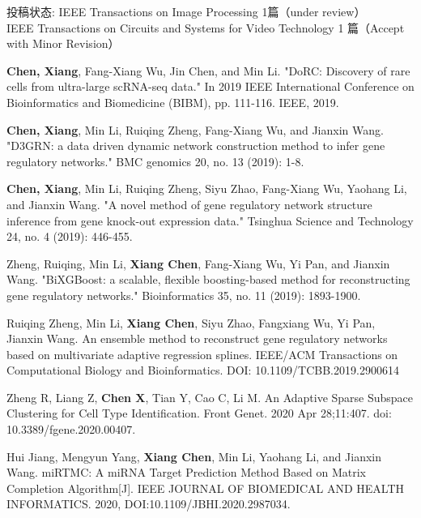 \noindent
投稿状态: 
IEEE Transactions on Image Processing 1篇（under review）\\{}
IEEE Transactions on Circuits and Systems for Video Technology 1 篇（Accept with Minor Revision）
\else
\begin{enumerate}[label={[\arabic*]},itemindent=2em,wide]


\item \textbf{Chen, Xiang}, Fang-Xiang Wu, Jin Chen, and Min Li. "DoRC: Discovery of rare cells from ultra-large scRNA-seq data." In 2019 IEEE International Conference on Bioinformatics and Biomedicine (BIBM), pp. 111-116. IEEE, 2019.
\item \textbf{Chen, Xiang}, Min Li, Ruiqing Zheng, Fang-Xiang Wu, and Jianxin Wang. "D3GRN: a data driven dynamic network construction method to infer gene regulatory networks." BMC genomics 20, no. 13 (2019): 1-8.
\item \textbf{Chen, Xiang}, Min Li, Ruiqing Zheng, Siyu Zhao, Fang-Xiang Wu, Yaohang Li, and Jianxin Wang. "A novel method of gene regulatory network structure inference from gene knock-out expression data." Tsinghua Science and Technology 24, no. 4 (2019): 446-455.
\item Zheng, Ruiqing, Min Li, \textbf{Xiang Chen}, Fang-Xiang Wu, Yi Pan, and Jianxin Wang. "BiXGBoost: a scalable, flexible boosting-based method for reconstructing gene regulatory networks." Bioinformatics 35, no. 11 (2019): 1893-1900.
\item Ruiqing Zheng, Min Li, \textbf{Xiang Chen}, Siyu Zhao, Fangxiang Wu, Yi Pan, Jianxin Wang. An ensemble method to reconstruct gene regulatory networks based on multivariate adaptive regression splines. IEEE/ACM Transactions on Computational Biology and Bioinformatics. DOI: 10.1109/TCBB.2019.2900614
\item Zheng R, Liang Z, \textbf{Chen X}, Tian Y, Cao C, Li M. An Adaptive Sparse Subspace Clustering for Cell Type Identification. Front Genet. 2020 Apr 28;11:407. doi: 10.3389/fgene.2020.00407.
\item Hui Jiang, Mengyun Yang, \textbf{Xiang Chen}, Min Li, Yaohang Li, and Jianxin Wang. miRTMC: A miRNA Target Prediction Method Based on Matrix Completion Algorithm[J]. IEEE JOURNAL OF BIOMEDICAL AND HEALTH INFORMATICS. 2020, DOI:10.1109/JBHI.2020.2987034. 

\end{enumerate}
